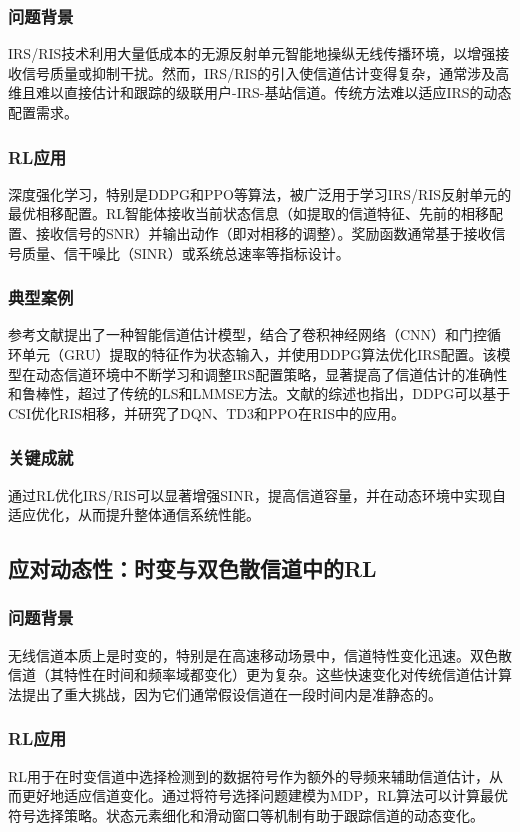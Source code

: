 \documentclass[journal]{IEEEtran}
\begin{document}
\subsubsection{问题背景}
IRS/RIS技术利用大量低成本的无源反射单元智能地操纵无线传播环境，以增强接收信号质量或抑制干扰。然而，IRS/RIS的引入使信道估计变得复杂，通常涉及高维且难以直接估计和跟踪的级联用户-IRS-基站信道\cite{ref1}。传统方法难以适应IRS的动态配置需求\cite{ref2}。

\subsubsection{RL应用}
深度强化学习，特别是DDPG和PPO等算法，被广泛用于学习IRS/RIS反射单元的最优相移配置\cite{ref1}。RL智能体接收当前状态信息（如提取的信道特征、先前的相移配置、接收信号的SNR）并输出动作（即对相移的调整）。奖励函数通常基于接收信号质量、信干噪比（SINR）或系统总速率等指标设计。

\subsubsection{典型案例}
参考文献\cite{ref1}提出了一种智能信道估计模型，结合了卷积神经网络（CNN）和门控循环单元（GRU）提取的特征作为状态输入，并使用DDPG算法优化IRS配置。该模型在动态信道环境中不断学习和调整IRS配置策略，显著提高了信道估计的准确性和鲁棒性，超过了传统的LS和LMMSE方法。文献\cite{ref7}的综述也指出，DDPG可以基于CSI优化RIS相移，并研究了DQN、TD3和PPO在RIS中的应用\cite{ref7}。

\subsubsection{关键成就}
通过RL优化IRS/RIS可以显著增强SINR，提高信道容量，并在动态环境中实现自适应优化，从而提升整体通信系统性能\cite{ref1}。

\subsection{应对动态性：时变与双色散信道中的RL}

\subsubsection{问题背景}
无线信道本质上是时变的，特别是在高速移动场景中，信道特性变化迅速。双色散信道（其特性在时间和频率域都变化）更为复杂。这些快速变化对传统信道估计算法提出了重大挑战，因为它们通常假设信道在一段时间内是准静态的\cite{ref3}。

\subsubsection{RL应用}
RL用于在时变信道中选择检测到的数据符号作为额外的导频来辅助信道估计，从而更好地适应信道变化\cite{ref12}。通过将符号选择问题建模为MDP，RL算法可以计算最优符号选择策略。状态元素细化和滑动窗口等机制有助于跟踪信道的动态变化\cite{ref12}。
\end{document}
